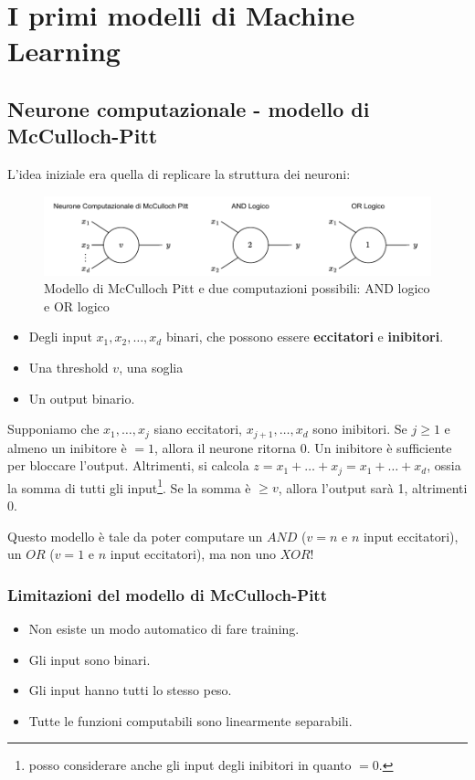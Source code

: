 \chapter{I primi modelli di Machine Learning}

\section{Neurone computazionale - modello di McCulloch-Pitt}
L'idea iniziale era quella di replicare la struttura dei neuroni:

\begin{figure}[tbph]
	\centering
	\includegraphics[width=\linewidth]{./images/neurone_computazionale.pdf}
	\caption{Modello di McCulloch Pitt e due computazioni possibili: AND logico e OR logico}
	\label{fig:neuronecomputazionale}
\end{figure}


\begin{itemize}
	\item Degli input $x_1, x_2, \dots, x_d$ binari, che possono essere \textbf{eccitatori }e \textbf{inibitori}. 
	\item Una threshold $v$, una soglia
	\item Un output binario.
\end{itemize}

Supponiamo che $x_1, \dots, x_j$ siano eccitatori, $x_{j+1}, \dots, x_d$ sono inibitori. Se $j \geq 1$ e almeno un inibitore è $=1$, allora il neurone ritorna 0. Un inibitore è sufficiente per bloccare l'output. Altrimenti, si calcola $z = x_1 + \dots + x_j = x_1 + \dots + x_d$, ossia la somma di tutti gli input\footnote{posso considerare anche gli input degli inibitori in quanto $=0$.}. Se la somma è $\geq v$, allora l'output sarà 1, altrimenti 0.

Questo modello è tale da poter computare un $AND$ ($v=n$ e $n$ input eccitatori), un $OR$ ($v=1$ e $n$ input eccitatori), ma non uno $XOR$!


\subsection{Limitazioni del modello di McCulloch-Pitt}
\begin{itemize}
	\item Non esiste un modo automatico di fare training.
	\item Gli input sono binari.
	\item Gli input hanno tutti lo stesso peso.
	\item Tutte le funzioni computabili sono linearmente separabili.
\end{itemize}

